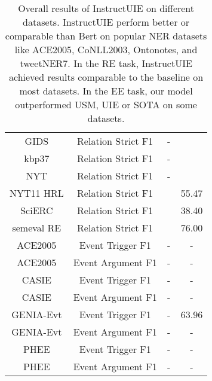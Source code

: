 \documentclass[11pt]{article}
\begin{document}
\begin{table*}[htbp]
{\begin{tabular}{c|c|cc}
    GIDS & Relation Strict F1 & - \\
    kbp37 & Relation Strict F1 & - \\
    NYT & Relation Strict F1 & - \\
    NYT11 HRL & Relation Strict F1 & \citet{NYT11HRLSOTA} & 55.47 \\
    SciERC & Relation Strict F1 & \citet{SciERCSOTA} & 38.40 \\ 
    semeval RE & Relation Strict F1 & \
    \citet{semevalRESOTA} & 76.00 \\
    ACE2005 & Event Trigger F1 & - & -  \\
    ACE2005 & Event Argument F1 & - & - \\
    CASIE & Event Trigger F1 & - & - \\
    CASIE & Event Argument F1 & - & - \\
    GENIA-Evt & Event Trigger F1 & - & 63.96 \\
    GENIA-Evt & Event Argument F1 & - & - \\
    PHEE & Event Trigger F1 & - & - \\
    PHEE & Event Argument F1 & - & - \\
    \bottomrule
    \end{tabular}
}
    \caption{
Overall results of InstructUIE on different datasets. InstructUIE perform better or comparable than Bert on popular NER datasets like ACE2005, CoNLL2003, Ontonotes, and tweetNER7. In the RE task, InstructUIE achieved results comparable to the baseline on most datasets. In the EE task, our model outperformed USM, UIE or SOTA on some datasets.
}
\label{supervised-result-withSOTA}
\end{table*}
\end{document}
